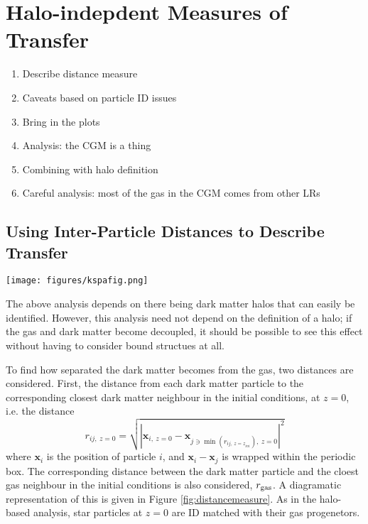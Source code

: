 \section{Halo-indepdent Measures of Transfer}

\begin{enumerate}
    \item Describe distance measure
    \item Caveats based on particle ID issues
    \item Bring in the plots
    \item Analysis: the CGM is a thing
    \item Combining with halo definition
    \item Careful analysis: most of the gas in the CGM comes from other LRs
\end{enumerate}

\subsection{Using Inter-Particle Distances to Describe Transfer}

\begin{figure*}
    \centering
    \texttt{[image: figures/kspafig.png]}
    \caption{A diagramatic representation of the distance measure. On the left, the initial conditions are shown. The blue dark matter particles each find their closest dark matter and gas (red) neighbour. These particles are then tracked to the final state of the simulation (right) and the distances between them calculated again.}
    \label{fig:distancemeasure}
\end{figure*}

The above analysis depends on there being dark matter halos that can easily be identified. However, this analysis need not depend on the definition of a halo; if the gas and dark matter become decoupled, it should be possible to see this effect without having to consider bound structues at all.

To find how separated the dark matter becomes from the gas, two distances are considered. First, the distance from each dark matter particle to the corresponding closest dark matter neighbour in the initial conditions, at $z=0$, i.e. the distance
\begin{equation}
    r_{ij, ~z=0} = \sqrt{
        \left|
            \mathbf{x}_{i, ~z=0} - \mathbf{x}_{j \ni \min(r_{ij, ~z=z_{ini}}), ~z=0}
        \right|^2
    }
    \label{eqn:minimal}
\end{equation}
where $\mathbf{x}_i$ is the position of particle $i$, and $\mathbf{x}_i - \mathbf{x}_j$ is wrapped within the periodic box. The corresponding distance between the dark matter particle and the cloest gas neighbour in the initial conditions is also considered, $r_{\rm gas}$. A diagramatic representation of this is given in Figure \ref{fig:distancemeasure}. As in the halo-based analysis, star particles at $z=0$ are ID matched with their gas progenetors.

